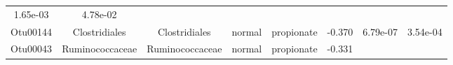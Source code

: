 \documentclass[11pt,]{article}
\begin{document}
\begin{longtable}[]{@{}cccccccc@{}}
\begin{minipage}[t]{0.08\columnwidth}
1.65e-03\strut
\end{minipage} & \begin{minipage}[t]{0.08\columnwidth}\centering\strut
4.78e-02\strut
\end{minipage}\tabularnewline
\begin{minipage}[t]{0.08\columnwidth}\centering\strut
Otu00144\strut
\end{minipage} & \begin{minipage}[t]{0.15\columnwidth}\centering\strut
Clostridiales\strut
\end{minipage} & \begin{minipage}[t]{0.15\columnwidth}\centering\strut
Clostridiales\strut
\end{minipage} & \begin{minipage}[t]{0.08\columnwidth}\centering\strut
normal\strut
\end{minipage} & \begin{minipage}[t]{0.09\columnwidth}\centering\strut
propionate\strut
\end{minipage} & \begin{minipage}[t]{0.07\columnwidth}\centering\strut
-0.370\strut
\end{minipage} & \begin{minipage}[t]{0.08\columnwidth}\centering\strut
6.79e-07\strut
\end{minipage} & \begin{minipage}[t]{0.08\columnwidth}\centering\strut
3.54e-04\strut
\end{minipage}\tabularnewline
\begin{minipage}[t]{0.08\columnwidth}\centering\strut
Otu00043\strut
\end{minipage} & \begin{minipage}[t]{0.15\columnwidth}\centering\strut
Ruminococcaceae\strut
\end{minipage} & \begin{minipage}[t]{0.15\columnwidth}\centering\strut
Ruminococcaceae\strut
\end{minipage} & \begin{minipage}[t]{0.08\columnwidth}\centering\strut
normal\strut
\end{minipage} & \begin{minipage}[t]{0.09\columnwidth}\centering\strut
propionate\strut
\end{minipage} & \begin{minipage}[t]{0.07\columnwidth}\centering\strut
-0.331\strut
\end{minipage} & \begin{minipage}[t]{0.08\columnwidth}\centering\strut

\end{minipage}
\end{longtable}
\end{document}
